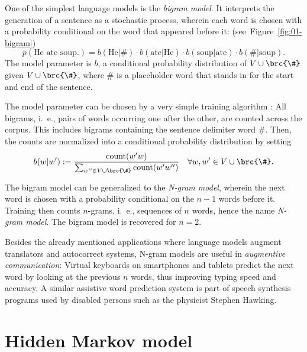 One of the simplest language models is the \emph{bigram model}.
\cite{vogler2015} It interprets the generation of a sentence as a stochastic
process, wherein each word is chosen with a probability conditional on the word
that appeared before it: (see~Figure~\ref{fig:01-bigram})
\[
 p(\text{He ate soup.}) = b(\text{He}|\#) \cdot b(\text{ate}|\text{He}) \cdot b(\text{soup}|\text{ate}) \cdot b(\#|\text{soup}).
\]
The model parameter is $b$, a conditional probability distribution of
$V\cup\brc{\#}$ given $V\cup\brc{\#}$, where $\#$ is a placeholder word
that stands in for the start and end of the sentence.

The model parameter can be chosen by a very simple training algorithm
\cite[pp.~123]{jm09}: All bigrams, i.~e., pairs of words occurring one after the
other, are counted across the corpus. This includes bigrams containing the
sentence delimiter word $\#$. Then, the counts are normalized into a
conditional probability distribution by setting
\[
 b(w|w') := \frac{\operatorname{count}(w'w)}{\sum_{w''\in V\cup\brc{\#}} \operatorname{count}(w'w'')}
 \quad\forall w,w'\in V\cup\brc{\#}.
\]

The bigram model can be generalized to the \emph{N-gram model}, wherein the
next word is chosen with a probability conditional on the $n-1$ words before
it. Training then counts $n$-grams, i.~e., sequences of $n$ words, hence the
name \emph{N-gram model}. The bigram model is recovered for $n=2$.

Besides the already mentioned applications where language models augment
translators and autocorrect systems, N-gram models are useful in
\emph{augmentive communication}: Virtual keyboards on smartphones and tablets
predict the next word by looking at the previous $n$ words, thus improving
typing speed and accuracy.  \cite{hasan2004n} A similar assistive word
prediction system is part of speech synthesis programs used by disabled persons
such as the physicist Stephen Hawking. \cite{newelletal1998}

\section{Hidden Markov model}

